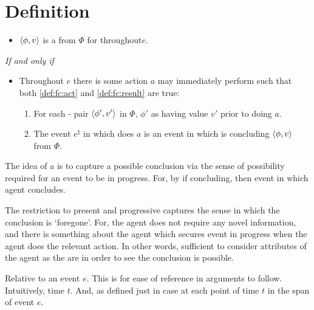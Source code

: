 \section{Definition}
\label{cha:fcs:def}

\begin{note}[\fc{2} definition]
  \begin{definition}[\fc{3}]%
    \label{def:fc}%
    \vspace{-\baselineskip}
    \begin{itemize}
    \item
      \(\langle \phi, v \rangle\) is a \emph{} from \(\Phi\) for \vAgent{} throughout\(e\).
    \end{itemize}

    \emph{If and only if}

    \begin{itemize}
    \item
      Throughout \(e\) there is some action \(a\) \vAgent{} may immediately perform such that both \ref{def:fc:act} and \ref{def:fc:result} are true:
      \begin{enumerate}[label=\alph*., ref=(\alph*), series=fcCounter]
      \item
        \label{def:fc:result}
        For each - pair \(\langle \phi', v' \rangle\) in \(\Phi\), \vAgent{} \evals{} \(\phi'\) as having value \(v'\) prior to doing \(a\).

      \item
        \label{def:fc:act}
        The event \(e^{\sharp}\) in which \vAgent{} does \(a\) is an event in which \vAgent{} is concluding \(\langle \phi, v \rangle\) from \(\Phi\).
      \end{enumerate}
    \end{itemize}
    \vspace{-\baselineskip}
  \end{definition}

  \noindent%
  The idea of a \fc{} is to capture a possible conclusion via the sense of possibility required for an event to be in progress.
  For, by \assuPP{} if concluding, then event in which agent concludes.

  The restriction to present \evals{} and progressive captures the sense in which the conclusion is `foregone'.
  For, the agent does not require any novel information, and there is something about the agent which secures event in progress when the agent does the relevant action.
  In other words, sufficient to consider attributes of the agent as the are in order to see the conclusion is possible.

  Relative to an event \(e\).
  This is for ease of reference in arguments to follow.
  Intuitively, time \(t\).
  And, \fc{} as defined just in case \fc{} at each point of time \(t\) in the span of event \(e\).
\end{note}

